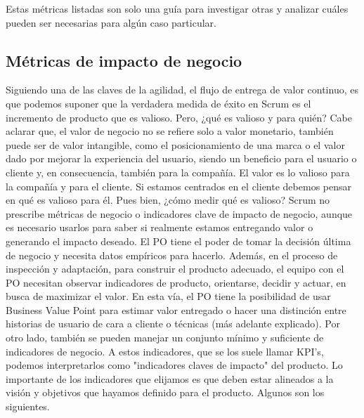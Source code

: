 Estas métricas listadas son solo una guía para investigar otras y analizar cuáles pueden ser necesarias para algún caso particular.

\subsection{Métricas de impacto de negocio}

Siguiendo una de las claves de la agilidad, el flujo de entrega de valor continuo, es que podemos suponer que la verdadera medida de éxito en Scrum es el incremento de producto que es valioso. Pero, ¿qué es valioso y para quién? Cabe aclarar que, el valor de negocio no se refiere solo a valor monetario, también puede ser de valor intangible, como el posicionamiento de una marca o el valor dado por mejorar la experiencia del usuario, siendo un beneficio para el usuario o cliente y, en consecuencia, también para la compañía. El valor es lo valioso para la compañía y para el cliente. Si estamos centrados en el cliente debemos pensar en qué es valioso para él. Pues bien, ¿cómo medir qué es valioso?
Scrum no prescribe métricas de negocio o indicadores clave de impacto de negocio, aunque es necesario usarlos para saber si realmente estamos entregando valor o generando el impacto deseado. El PO tiene el poder de tomar la decisión última de negocio y necesita datos empíricos para hacerlo. Además, en el proceso de inspección y adaptación, para construir el producto adecuado, el equipo con el PO necesitan observar indicadores de producto, orientarse, decidir y actuar, en busca de maximizar el valor. En esta vía, el PO tiene la posibilidad de usar Business Value Point para estimar valor entregado o hacer una distinción entre historias de usuario de cara a cliente o técnicas (más adelante explicado). Por otro lado, también se pueden manejar un conjunto mínimo y suficiente de indicadores de negocio. A estos indicadores, que se los suele llamar KPI's, podemos interpretarlos como "indicadores claves de impacto" del producto. Lo importante de los indicadores que elijamos es que deben estar alineados a la visión y objetivos que hayamos definido para el producto.
Algunos son los siguientes.




